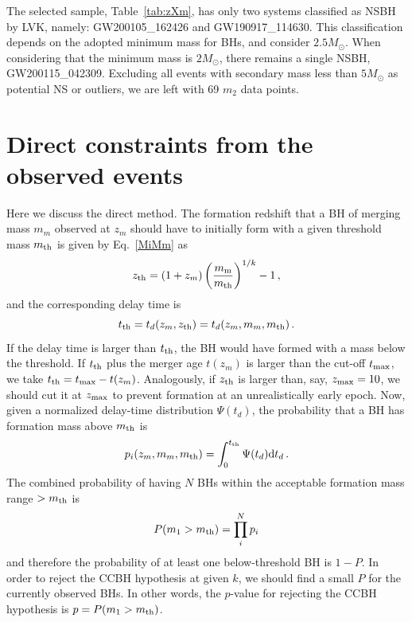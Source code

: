\documentclass[fleqn,usenatbib,useAMS]{mnras}
\newcommand{\dd}{\textrm{d}}
\begin{document}
The selected sample, Table~\ref{tab:zXm}, has only two systems classified as NSBH by LVK, namely: GW200105\_162426 and GW190917\_114630. This classification depends on the adopted minimum mass for BHs, and \citet{KAGRA:2021duu} consider $2.5 M_\odot$. When considering that the minimum mass is  $2M_\odot$, there remains a single  NSBH, GW200115\_042309. Excluding all events with secondary mass less than $5M_\odot$ as potential NS or outliers, we are left with 69 $m_2$ data points.

\section{Direct constraints from the observed events}  \label{sec:direct}

Here we discuss the direct method. The formation redshift that a BH of merging mass $m_{m}$ observed at $z_{m}$ should have to initially form with a given threshold mass $m_{\rm th}$ is given by Eq.~\eqref{MiMm} as
\begin{equation}
    z_{\rm th}=(1+z_{m})\left(\frac{m_{\rm m}}{m_{\rm th}}\right)^{1/k}-1 \,,
\end{equation}
and the corresponding delay time is 
\begin{equation}
    t_{\rm th}=t_{d}(z_{m},z_{\rm th})=t_{d}(z_{m},m_{m},m_{\rm th})\,.
\end{equation}
If the delay time is larger than $t_{\rm th}$, the BH would have formed with
a mass below the threshold. If $t_{\rm th}$ plus the merger age $t(z_m)$ is larger than the cut-off $t_{\rm max}$, we take $t_{\rm th}=t_{{\rm max}}-t(z_m)$. Analogously, if $z_{\rm th}$ is larger than, say, $z_{\rm max}=10$, we should cut it at $z_{\rm max}$ to prevent formation at an unrealistically early epoch.
Now, given a normalized delay-time distribution $\Psi(t_{d})$, the probability that a BH has formation mass above $m_{\rm th}$ is 
\begin{equation}
    p_{i}(z_{m},m_{m},m_{\rm th})=\int_{0}^{t_{\rm th}}\Psi(t_{d})\dd t_{d} \,.\label{eq:ptd}
\end{equation}
The combined probability of having $N$ BHs within the acceptable formation mass range $>m_{\rm th}$ is
\begin{equation}
    P(m_1>m_{\rm th})=\prod_{i}^{N}p_{i}
\label{eq:fullp}
\end{equation}
and therefore the probability of at least one below-threshold BH is $1-P$. In order to reject the CCBH hypothesis at given $k$, we should find a small $P$ for the currently observed BHs.  In other words, the $p$-value for rejecting the CCBH hypothesis is $p=P(m_1>m_{\rm th})$.
\end{document}

